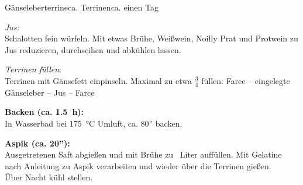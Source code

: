 \begin{MyRecipe}{Gänseleberterrine}{ca.  Terrinen}{ca. einen Tag}
	
\textit{Jus:}\\	
Schalotten fein würfeln. Mit etwas Brühe, Weißwein, Noilly Prat und Protwein zu Jus reduzieren, durchseihen und abkühlen lassen.


\textit{Terrinen füllen}:\\
Terrinen mit Gänsefett einpinseln. Maximal zu etwa $\frac34$ füllen: Farce -- eingelegte Gänseleber -- Jus -- Farce\par\bigskip

\textbf{Backen (ca. 1.5~h):}\\
In Wasserbad bei \SI{175}{\celsius} Umluft, ca. 80'' backen.\par\bigskip

\textbf{Aspik (ca. 20''):}\\
Ausgetretenen Saft abgießen und mit Brühe zu ~Liter auffüllen. Mit Gelatine nach Anleitung zu Aspik verarbeiten und wieder über die Terrinen gießen.\\
Über Nacht kühl stellen.
\par\bigskip



			
\end{MyRecipe}